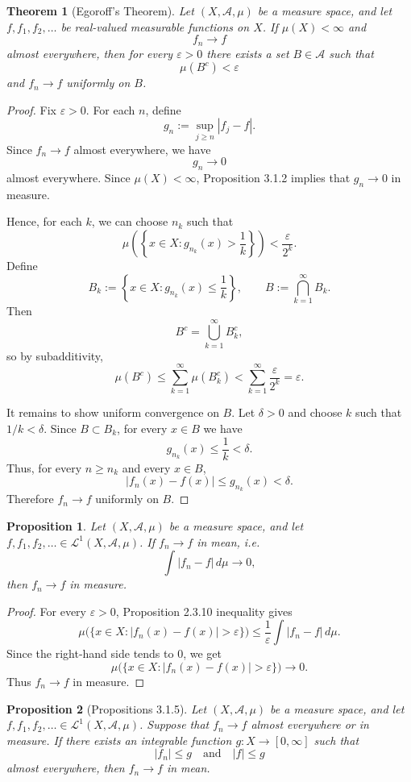 \documentclass[12pt]{article}
\newtheorem{theorem}{Theorem}
\newtheorem{proposition}{Proposition}
\begin{document}
\begin{theorem}[Egoroff's Theorem]
Let $(X,\mathcal{A},\mu)$ be a measure space, and let $f,f_1,f_2,\dots$ be
real-valued measurable functions on $X$. If $\mu(X)<\infty$ and
\[
f_n \to f
\]
almost everywhere, then for every $\varepsilon>0$ there exists a set
$B\in\mathcal{A}$ such that
\[
\mu(B^c)<\varepsilon
\]
and $f_n\to f$ uniformly on $B$.
\end{theorem}

\begin{proof}
Fix $\varepsilon>0$. For each $n$, define
\[
g_n:=\sup_{j\ge n}|f_j-f|.
\]
Since $f_n\to f$ almost everywhere, we have
\[
g_n\to 0
\]
almost everywhere. Since $\mu(X)<\infty$, Proposition 3.1.2 implies that
$g_n\to 0$ in measure.

Hence, for each $k$, we can choose $n_k$ such that
\[
\mu\left(\left\{x\in X:g_{n_k}(x)>\frac1k\right\}\right)
<
\frac{\varepsilon}{2^k}.
\]
Define
\[
B_k:=\left\{x\in X:g_{n_k}(x)\le \frac1k\right\},
\qquad
B:=\bigcap_{k=1}^\infty B_k.
\]
Then
\[
B^c=\bigcup_{k=1}^\infty B_k^c,
\]
so by subadditivity,
\[
\mu(B^c)
\le
\sum_{k=1}^\infty \mu(B_k^c)
<
\sum_{k=1}^\infty \frac{\varepsilon}{2^k}
=
\varepsilon.
\]

It remains to show uniform convergence on $B$. Let $\delta>0$ and choose $k$
such that $1/k<\delta$. Since $B\subset B_k$, for every $x\in B$ we have
\[
g_{n_k}(x)\le \frac1k<\delta.
\]
Thus, for every $n\ge n_k$ and every $x\in B$,
\[
|f_n(x)-f(x)|
\le
g_{n_k}(x)
<
\delta.
\]
Therefore $f_n\to f$ uniformly on $B$.
\end{proof}

\begin{proposition}
Let $(X,\mathcal{A},\mu)$ be a measure space, and let
$f,f_1,f_2,\dots \in \mathcal{L}^1(X,\mathcal{A},\mu)$. If $f_n\to f$ in mean, i.e.
\[
\int |f_n-f|\,d\mu \to 0,
\]
then $f_n\to f$ in measure.
\end{proposition}

\begin{proof}
For every $\varepsilon>0$, Proposition 2.3.10 inequality gives
\[
\mu\big(\{x\in X: |f_n(x)-f(x)|>\varepsilon\}\big)
\le
\frac{1}{\varepsilon}\int |f_n-f|\,d\mu.
\]
Since the right-hand side tends to $0$, we get
\[
\mu\big(\{x\in X: |f_n(x)-f(x)|>\varepsilon\}\big)\to 0.
\]
Thus $f_n\to f$ in measure.
\end{proof}

\begin{proposition}[Propositions 3.1.5]
Let $(X,\mathcal{A},\mu)$ be a measure space, and let
$f,f_1,f_2,\dots \in \mathcal{L}^1(X,\mathcal{A},\mu)$. Suppose that $f_n\to f$ almost
everywhere or in measure. If there exists an integrable function
$g:X\to[0,\infty]$ such that
\[
|f_n|\le g
\quad\text{and}\quad
|f|\le g
\]
almost everywhere, then $f_n\to f$ in mean.
\end{proposition}
\end{document}
